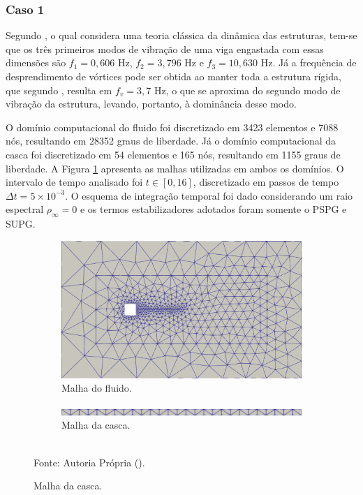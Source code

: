 \subsubsection{Caso 1}

Segundo , o qual considera uma teoria clássica da dinâmica das estruturas, tem-se que os três primeiros modos de vibração de uma viga engastada com essas dimensões são $f_1=0,606$ Hz, $f_2=3,796$ Hz e $f_3=10,630$ Hz. Já a frequência de desprendimento de vórtices pode ser obtida ao manter toda a estrutura rígida, que segundo , resulta em $f_v=3,7$ Hz, o que se aproxima do segundo modo de vibração da estrutura, levando, portanto, à dominância desse modo.

O domínio computacional do fluido foi discretizado em 3423 elementos e 7088 nós, resultando em 28352 graus de liberdade. Já o domínio computacional da casca foi discretizado em 54 elementos e 165 nós, resultando em 1155 graus de liberdade. A Figura \ref{fig:meshPanel} apresenta as malhas utilizadas em ambos os domínios. O intervalo de tempo analisado foi $t\in[0,16]$, discretizado em passos de tempo $\Delta t=5\times10^{-3}$. O esquema de integração temporal foi dado considerando um raio espectral $\rho_\infty=0$ e os termos estabilizadores adotados foram somente o PSPG e SUPG.

\begin{figure}[h!]
    \centering
    \caption{\textit{Flutter} em painel - Caso 1 - Malha utilizada para os domínios da simulação de painel.}
    \begin{subfigure}[b]{\textwidth}
        \includegraphics[width=\linewidth]{Figuras/FSI-prism/meshFluid.png}
        \caption{Malha do fluido.}
    \end{subfigure}
    \begin{subfigure}[b]{\textwidth}
        \includegraphics[width=\linewidth]{Figuras/FSI-prism/meshSolid.png}
        \caption{Malha da casca.}
    \end{subfigure}
    \\Fonte: Autoria Própria (\the\year).
    \label{fig:meshPanel}
\end{figure}

